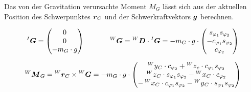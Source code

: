 Das von der Gravitation verursachte Moment $M_G$ lässt sich aus der aktuellen Position des Schwerpunktes $\boldsymbol{r}_C$ und der Schwerkraftvektors $\boldsymbol{g}$ berechnen.

\begin{equation}
\prescript{I}{}{}\boldsymbol{G} = \begin{pmatrix}
0 \\ 0 \\ -m_G \cdot g
\end{pmatrix}
\hspace{35pt}
\prescript{W}{}{}\boldsymbol{G} = \prescript{W}{}{}\boldsymbol{D} \cdot \prescript{I}{}{}\boldsymbol{G} = -m_G \cdot g \cdot \begin{pmatrix}
s_{\varphi_1}s_{\varphi_2} \\ -c_{\varphi_1}s_{\varphi_2} \\ c_{\varphi_2}
\end{pmatrix}
\end{equation}

\begin{equation}
\prescript{W}{}{}\boldsymbol{M}_G = \prescript{W}{}{}\boldsymbol{r}_C \times \prescript{W}{}{}\boldsymbol{G} = -m_G \cdot g \cdot  \begin{pmatrix}
\prescript{W}{} y_C \cdot c_{\varphi_2} + \prescript{W}{} z_c \cdot c_{\varphi_1} s_{\varphi_2} \\
\prescript{W}{} z_C \cdot s_{\varphi_1}s_{\varphi_2} - \prescript{W}{} x_C \cdot c_{\varphi_2} \\
- \prescript{W}{} x_C \cdot c_{\varphi_1}s_{\varphi_2} - \prescript{W}{} y_C \cdot s_{\varphi_1} s_{\varphi_2} 
\end{pmatrix} 
\end{equation}